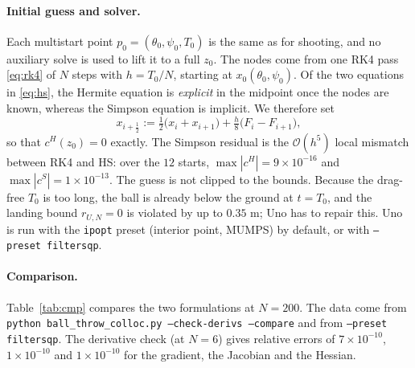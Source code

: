 \documentclass[11pt]{article}
\begin{document}
\paragraph{Initial guess and solver.} Each multistart point $p_0 = (\theta_0,\psi_0,T_0)$ is the
same as for shooting, and no auxiliary solve is used to lift it to a full $z_0$. The nodes come
from one RK4 pass \eqref{eq:rk4} of $N$ steps with $h = T_0/N$, starting at $x_0(\theta_0,\psi_0)$.
Of the two equations in \eqref{eq:hs}, the Hermite equation is \emph{explicit} in the midpoint
once the nodes are known, whereas the Simpson equation is implicit. We therefore set
\[
  x_{i+\frac12} := \tfrac12\bigl(x_i + x_{i+1}\bigr) + \tfrac h8\bigl(F_i - F_{i+1}\bigr),
\]
so that $c^H(z_0) = 0$ exactly. The Simpson residual is the $\mathcal{O}(h^5)$ local mismatch between RK4
and HS: over the $12$ starts, $\max|c^H| = 9\times10^{-16}$ and $\max|c^S| = 1\times10^{-13}$. The
guess is not clipped to the bounds. Because the drag-free $T_0$ is too long, the ball is already
below the ground at $t = T_0$, and the landing bound $r_{U,N} = 0$ is violated by up to $0.35$ m;
Uno has to repair this. Uno is run with the \texttt{ipopt} preset (interior point, MUMPS) by
default, or with \texttt{--preset filtersqp}.

\paragraph{Comparison.} Table~\ref{tab:cmp} compares the two formulations at $N=200$. The data come
from \texttt{python ball\_throw\_colloc.py --check-derivs --compare} and from
\texttt{--preset filtersqp}. The derivative check (at $N=6$) gives relative errors of
$7\times10^{-10}$, $1\times10^{-10}$ and $1\times10^{-10}$ for the gradient, the Jacobian and the
Hessian.
\end{document}
